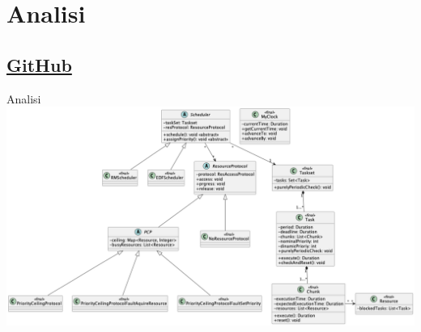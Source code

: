 \section{Analisi}
\subsection{\href{https://github.com/edoardosarri24/real-time-scheduling-simulator.git}{GitHub}}

\begin{frame}{Analisi}
    \centering
    \includegraphics[width=\linewidth]{images/2-analisi/class diagram.pdf}
\end{frame}